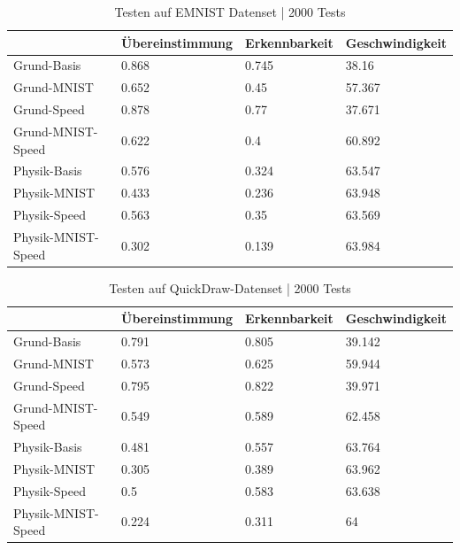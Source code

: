 \begin{table}[!ht]
    \centering
    \caption{Testen auf EMNIST Datenset | 2000 Tests}
    \begin{tabular}{|l|l|l|l|}
    \hline
        ~ & Übereinstimmung  & Erkennbarkeit  & Geschwindigkeit \\ \hline
        Grund-Basis & 0.868 & 0.745 & 38.16 \\ \hline
        Grund-MNIST & 0.652 & 0.45 & 57.367 \\ \hline
        Grund-Speed & 0.878 & 0.77 & 37.671 \\ \hline
        Grund-MNIST-Speed & 0.622 & 0.4 & 60.892 \\ \hline
        Physik-Basis & 0.576 & 0.324 & 63.547 \\ \hline
        Physik-MNIST & 0.433 & 0.236 & 63.948 \\ \hline
        Physik-Speed & 0.563 & 0.35 & 63.569 \\ \hline
        Physik-MNIST-Speed & 0.302 & 0.139 & 63.984 \\ \hline
    \end{tabular}
    \label{tab:EMNIST}
\end{table}

\begin{table}[!ht]
    \centering
    \caption{Testen auf QuickDraw-Datenset | 2000 Tests}
    \begin{tabular}{|l|l|l|l|}
    \hline
        ~ & Übereinstimmung  & Erkennbarkeit  & Geschwindigkeit \\ \hline
        Grund-Basis & 0.791 & 0.805 & 39.142 \\ \hline
        Grund-MNIST & 0.573 & 0.625 & 59.944 \\ \hline
        Grund-Speed & 0.795 & 0.822 & 39.971 \\ \hline
        Grund-MNIST-Speed & 0.549 & 0.589 & 62.458 \\ \hline
        Physik-Basis & 0.481 & 0.557 & 63.764 \\ \hline
        Physik-MNIST & 0.305 & 0.389 & 63.962 \\ \hline
        Physik-Speed & 0.5 & 0.583 & 63.638 \\ \hline
        Physik-MNIST-Speed & 0.224 & 0.311 & 64 \\ \hline
    \end{tabular}
    \label{tab:Quickdraw}
\end{table}

\newpage


